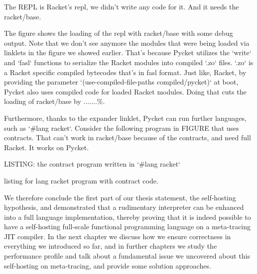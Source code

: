 		\begin{paragraph-here}%
			The REPL is Racket's repl, we didn't write any code for it. And it needs the racket/base.
		\end{paragraph-here}


		\begin{paragraph-here}%
			The figure shows the loading of the repl with racket/base with some debug output. Note that we don't see anymore the modules that were being loaded via linklets in the figure we showed earlier. That's because Pycket utilizes the `write` and `fasl` functions to serialize the Racket modules into compiled `.zo` files. `.zo` is a Racket specific compiled bytecodes that's in fasl format. Just like, Racket, by providing the parameter `(use-compiled-file-paths compiled/pycket)` at boot, Pycket also uses compiled code for loaded Racket modules. Doing that cuts the loading of racket/base by .......\%.
		\end{paragraph-here}

		\begin{paragraph-here}%
			Furthermore, thanks to the expander linklet, Pycket can run further languages, such as `\#lang racket`. Consider the following program in FIGURE that uses contracts. That can't work in racket/base because of the contracts, and need full Racket. It works on Pycket.
		\end{paragraph-here}

		\begin{figure-here}
			LISTING: the contract program written in `\#lang racket`

			\begin{todo}
				listing for lang racket program with contract code.
			\end{todo}
		\end{figure-here}

		\begin{paragraph-here}%
			We therefore conclude the first part of our thesis statement, the self-hosting hypothesis, and demonstrated that a rudimentary interpreter can be enhanced into a full language implementation, thereby proving that it is indeed possible to have a self-hosting full-scale functional programming language on a meta-tracing JIT compiler.
			In the next chapter we discuss how we ensure correctness in everything we introduced so far, and in further chapters we study the performance profile and talk about a fundamental issue we uncovered about this self-hosting on meta-tracing, and provide some solution approaches.
		\end{paragraph-here}


